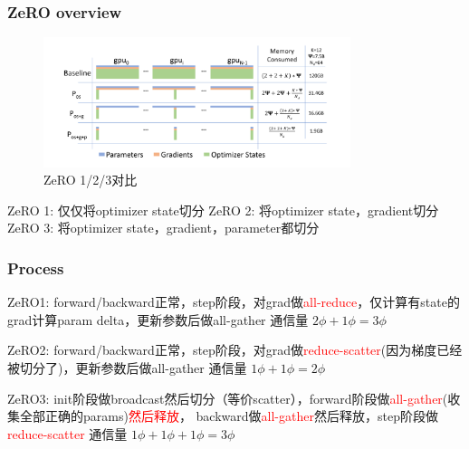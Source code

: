 \documentclass{beamer}
\begin{document}
\begin{frame}[fragile]
\frametitle{ZeRO overview}

\begin{figure}[h]
    \centering
    \includegraphics[width=0.8\textwidth]{zero.png}
    \captionsetup{labelformat=empty}
    \caption{ZeRO 1/2/3对比}
\end{figure}

ZeRO 1: 仅仅将optimizer state切分\newline
ZeRO 2: 将optimizer state，gradient切分\newline
ZeRO 3: 将optimizer state，gradient，parameter都切分\newline

\end{frame}


\begin{frame}[fragile]
\frametitle{Process}

ZeRO1: forward/backward正常，step阶段，对grad做\textcolor{red}{all-reduce}，仅计算有state的grad计算param delta，更新参数后做all-gather\newline
通信量 \(2\phi + 1\phi = 3\phi\)\newline\newline

ZeRO2: forward/backward正常，step阶段，对grad做\textcolor{red}{reduce-scatter}(因为梯度已经被切分了)，更新参数后做all-gather\newline
通信量 \(1\phi + 1\phi = 2\phi\)\newline\newline

ZeRO3: init阶段做broadcast然后切分（等价scatter），forward阶段做\textcolor{red}{all-gather}(收集全部正确的params)\textcolor{red}{然后释放}，
backward做\textcolor{red}{all-gather}然后释放，step阶段做\textcolor{red}{reduce-scatter}\newline
通信量 \(1\phi + 1\phi + 1\phi = 3\phi\)\newline

\end{frame}
\end{document}
